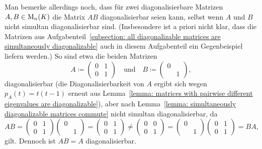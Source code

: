 \begin{remark}
  Man bemerke allerdings noch, dass für zwei diagonalisierbare Matrizen $A, B \in \operatorname{M}_{n}(K)$ die Matrix $AB$ diagonalisierbar seien kann, selbst wenn $A$ und $B$ nicht simultan diagonalisierbar sind.
  (Insbesondere ist a priori nicht klar, dass die Matrizen aus Aufgabenteil~\ref{subsection: all diagonalizable matrices are simultaneously diagonalizable} auch in diesem Aufgabenteil ein Gegenbeispiel liefern werden.)
  So sind etwa die beiden Matrizen
  \[
              A
    \coloneqq \begin{pmatrix}
                0 & 1
                \\
                0 & 1
              \end{pmatrix}
    \quad\text{und}\quad
              B
    \coloneqq \begin{pmatrix}
                0 & 
                \\
                  & 1
              \end{pmatrix},
  \]
  diagonalisierbar (die Diagonalisierbarkeit von $A$ ergibt sich wegen $p_A(t) = t(t-1)$ erneut aus Lemma~\ref{lemma: matrices with pairwise different eigenvalues are diagonalizable}), aber nach Lemma~\ref{lemma: simultaneously diagonalizable matrices commute} nicht simultan diagonalisierbar, da
\[
        A B
  =     \begin{pmatrix}
          0 & 1
          \\
          0 & 1
        \end{pmatrix}
        \begin{pmatrix}
          0 & 
          \\
            & 1
        \end{pmatrix}
  =     \begin{pmatrix}
          0 & 1
          \\
          0 & 1
        \end{pmatrix}
  \neq  \begin{pmatrix}
          0 & 0
          \\
          0 & 1
        \end{pmatrix}
  =     \begin{pmatrix}
          0 & 
          \\
            & 1
        \end{pmatrix}
        \begin{pmatrix}
          0 & 1
          \\
          0 & 1
        \end{pmatrix}
  =     B A,
\]
gilt.
Dennoch ist $A B = A$ diagonalisierbar.
\end{remark}





